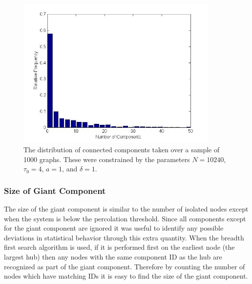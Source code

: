 \documentclass[preprint,notitlepage,amsmath,amssymb,floatfix]{revtex4-1}
\begin{document}

\begin{figure}
\includegraphics[width=10cm]{figures/Number_Components.jpg}
\caption{The distribution of connected components taken over a sample of 1000 graphs.  These were constrained by the parameters $N = 10240$, $\tau_0 = 4$, $a = 1$, and $\delta = 1$.}
\label{fig:num_comp_uni}
\centering
\end{figure}

\subsubsection{Size of Giant Component}
The size of the giant component is similar to the number of isolated nodes except when the system is below the percolation threshold.  
Since all components except for the giant component are ignored it was useful to identify any possible deviations in statistical behavior through this extra quantity.
When the breadth first search algorithm is used, if it is performed first on the earliest node (the largest hub) then any nodes with the same component ID as the hub are recognized as part of the giant component.
Therefore by counting the number of nodes which have matching IDs it is easy to find the size of the giant component.

\end{document}

